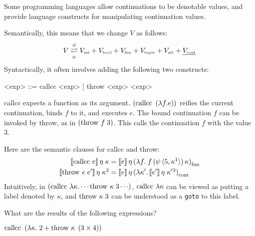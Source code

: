 \begin{enumcirc}
	\item
	Some programming languages allow continuations to be denotable values, and
	provide language constructs for manipulating continuation values.
	\item
	Semantically, this means that we change $V$ as follows:
	\[
		V \mathrel{\mathop{\rightleftarrows}^{\mathrm{\phi}}_{\mathrm{\psi}}}
		V_{\textrm{\tiny int}} + V_{\textrm{\tiny bool}} + V_{\textrm{\tiny fun}} + V_{\textrm{\tiny tuple}} + V_{\textrm{\tiny alt}} + \underline{V_{\textrm{\tiny cont}}}
	\]
	Syntactically, it often involves adding the following two constructs:
	\begin{center}
		\begin{minipage}{0.5\textwidth}
			\begin{grammar}
				<exp> ::= callcc <exp> | throw <exp> <exp>
			\end{grammar}
		\end{minipage}
	\end{center}
	callcc expects a function as its argument.
	$\left( \textrm{callcc }\left( \lambda f.e \right) \right)$ reifies the current continuation, binds $f$ to it,
	and executes $e$.
	The bound continuation $f$ can be invoked by throw, as in
	$\left( \textrm{throw } f \; 3 \right)$.
	This calls the continuation $f$ with the value $3$.
	\item
	Here are the semantic clauses for callcc and throw:
	\begin{align*}
		\bbrackets{\lcallcc e} \eta \; \kappa                   & =
		\bbrackets{e} \eta \prths{\lambda f. \; f \prths{\psi \chevrons{5, \kappa \footnotemark}} \kappa }_{\textrm{fun}} \\
		\bbrackets{\lthrow{e}{e'}} \eta \; \kappa \footnotemark & =
		\bbrackets{e} \eta \prths{\lambda \kappa'. \bbrackets{e'} \eta \; \kappa' \footnotemark}_{\textrm{cont}}
	\end{align*}
	Intuitively, in
	$\prths{\lcallcc \lambda \kappa . \cdots \lthrow{\kappa}{3} \cdots}$,
	$\textrm{callcc } \lambda \kappa$ can be viewed as putting a label denoted by $\kappa$,
	and $\textrm{throw } \kappa \; 3$ can be understood as a \texttt{goto} to this label.
	\item
	What are the results of the following expressions?
	\begin{enumrm}
		\item
		$\textrm{callcc } \left( \lambda \kappa . \; 2 + \textrm{throw } \kappa \; \left( 3 \times 4 \right) \right)$

\end{enumrm}
\end{enumcirc}
